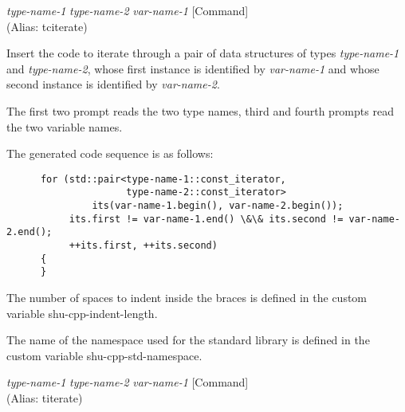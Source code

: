 \vspace{1em}
\noindent
{}
\usebox{\funcname}\emph{type-name-1} \emph{type-name-2} \emph{var-name-1}
 \hfill [Command]
\hspace*{\wd\funcname}\\%
 (Alias: tciterate)

\begin{doc-string}
Insert the code to iterate through a pair of data structures of types
\emph{type-name-1} and \emph{type-name-2}, whose first instance is identified by \emph{var-name-1}
and whose second instance is identified by \emph{var-name-2}.

The first two prompt reads the two type names, third and fourth prompts read the
two variable names.

The generated code sequence is as follows:

\small{\begin{verbatim}
      for (std::pair<type-name-1::const_iterator,
                     type-name-2::const_iterator>
               its(var-name-1.begin(), var-name-2.begin());
           its.first != var-name-1.end() \&\& its.second != var-name-2.end();
           ++its.first, ++its.second)
      {
      }
\end{verbatim}}

The number of spaces to indent inside the braces is defined in the custom
variable shu-cpp-indent-length.

The name of the namespace used for the standard library is defined in the custom
variable shu-cpp-std-namespace.
\end{doc-string}

\vspace{1em}
\noindent
{}
\usebox{\funcname}\emph{type-name-1} \emph{type-name-2} \emph{var-name-1}
 \hfill [Command]
\hspace*{\wd\funcname}\\%
 (Alias: titerate)

